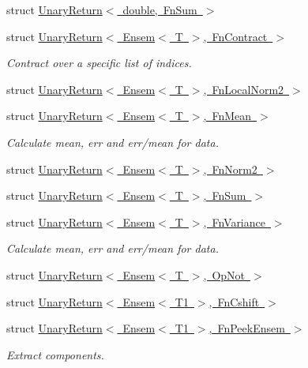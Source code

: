 \begin{DoxyCompactItemize}
struct \mbox{\hyperlink{structENSEM_1_1UnaryReturn_3_01double_00_01FnSum_01_4}{Unary\+Return$<$ double, Fn\+Sum $>$}}
\item 
struct \mbox{\hyperlink{structENSEM_1_1UnaryReturn_3_01Ensem_3_01T_01_4_00_01FnContract_01_4}{Unary\+Return$<$ Ensem$<$ T $>$, Fn\+Contract $>$}}
\begin{DoxyCompactList}\small\item\em Contract over a specific list of indices. \end{DoxyCompactList}\item 
struct \mbox{\hyperlink{structENSEM_1_1UnaryReturn_3_01Ensem_3_01T_01_4_00_01FnLocalNorm2_01_4}{Unary\+Return$<$ Ensem$<$ T $>$, Fn\+Local\+Norm2 $>$}}
\item 
struct \mbox{\hyperlink{structENSEM_1_1UnaryReturn_3_01Ensem_3_01T_01_4_00_01FnMean_01_4}{Unary\+Return$<$ Ensem$<$ T $>$, Fn\+Mean $>$}}
\begin{DoxyCompactList}\small\item\em Calculate mean, err and err/mean for data. \end{DoxyCompactList}\item 
struct \mbox{\hyperlink{structENSEM_1_1UnaryReturn_3_01Ensem_3_01T_01_4_00_01FnNorm2_01_4}{Unary\+Return$<$ Ensem$<$ T $>$, Fn\+Norm2 $>$}}
\item 
struct \mbox{\hyperlink{structENSEM_1_1UnaryReturn_3_01Ensem_3_01T_01_4_00_01FnSum_01_4}{Unary\+Return$<$ Ensem$<$ T $>$, Fn\+Sum $>$}}
\item 
struct \mbox{\hyperlink{structENSEM_1_1UnaryReturn_3_01Ensem_3_01T_01_4_00_01FnVariance_01_4}{Unary\+Return$<$ Ensem$<$ T $>$, Fn\+Variance $>$}}
\begin{DoxyCompactList}\small\item\em Calculate mean, err and err/mean for data. \end{DoxyCompactList}\item 
struct \mbox{\hyperlink{structENSEM_1_1UnaryReturn_3_01Ensem_3_01T_01_4_00_01OpNot_01_4}{Unary\+Return$<$ Ensem$<$ T $>$, Op\+Not $>$}}
\item 
struct \mbox{\hyperlink{structENSEM_1_1UnaryReturn_3_01Ensem_3_01T1_01_4_00_01FnCshift_01_4}{Unary\+Return$<$ Ensem$<$ T1 $>$, Fn\+Cshift $>$}}
\item 
struct \mbox{\hyperlink{structENSEM_1_1UnaryReturn_3_01Ensem_3_01T1_01_4_00_01FnPeekEnsem_01_4}{Unary\+Return$<$ Ensem$<$ T1 $>$, Fn\+Peek\+Ensem $>$}}
\begin{DoxyCompactList}\small\item\em Extract components. \end{DoxyCompactList}\item 

\end{DoxyCompactItemize}
